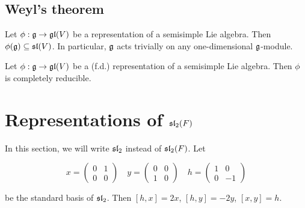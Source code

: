\documentclass{article}
\renewcommand{\sl}{\mfs\mfl}
\begin{document}
\subsection{Weyl's theorem}

\begin{lemma}
    Let \(\phi : \mathfrak{g} \to \mathfrak{g}\mathfrak{l}(V)\) be a representation of a semisimple Lie algebra. Then \(\phi(\mfg) \subseteq \sl(V)\). In particular, \(\mathfrak{g}\) acts trivially on any one-dimensional \(\mathfrak{g}\)-module.
\end{lemma}

\begin{theorem}
    [Weyl] Let \(\phi : \mathfrak{g} \to \mathfrak{g}\mathfrak{l}(V)\) be a (f.d.) representation of a semisimple Lie algebra. Then \(\phi\) is completely reducible.
\end{theorem}

\section{Representations of \(\sl_2(F)\)}

In this section, we will write \(\sl_2\) instead of \(\sl_2(F)\). Let

\[x = \begin{pmatrix}
    0 & 1 \\
    0 & 0
\end{pmatrix} \quad y = \begin{pmatrix}
    0 & 0 \\
    1 & 0
\end{pmatrix} \quad h = \begin{pmatrix}
    1 & 0 \\
    0 & -1
\end{pmatrix}\]

be the standard basis of \(\sl_2\). Then \([h, x] = 2x\), \([h, y] = -2y\), \([x, y] = h\). 
\end{document}
